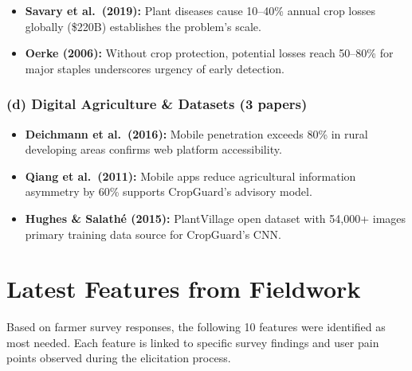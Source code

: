 \documentclass[12pt,a4paper]{article}
\begin{document}
\begin{itemize}[leftmargin=*, nosep]
    \item \textbf{Savary et al.\ (2019):} Plant diseases cause 10--40\% annual crop losses globally (\$220B)  establishes the problem's scale.
    \item \textbf{Oerke (2006):} Without crop protection, potential losses reach 50--80\% for major staples  underscores urgency of early detection.
\end{itemize}

\subsubsection*{(d) Digital Agriculture \& Datasets (3 papers)}

\begin{itemize}[leftmargin=*, nosep]
    \item \textbf{Deichmann et al.\ (2016):} Mobile penetration exceeds 80\% in rural developing areas confirms web platform accessibility.
    \item \textbf{Qiang et al.\ (2011):} Mobile apps reduce agricultural information asymmetry by 60\%  supports CropGuard's advisory model.
    \item \textbf{Hughes \& Salath\'{e} (2015):} PlantVillage open dataset with 54,000+ images  primary training data source for CropGuard's CNN.
\end{itemize}

\section{Latest Features from Fieldwork}

Based on farmer survey responses, the following 10 features were identified as most needed. Each feature is linked to specific survey findings and user pain points observed during the elicitation process.
\end{document}
